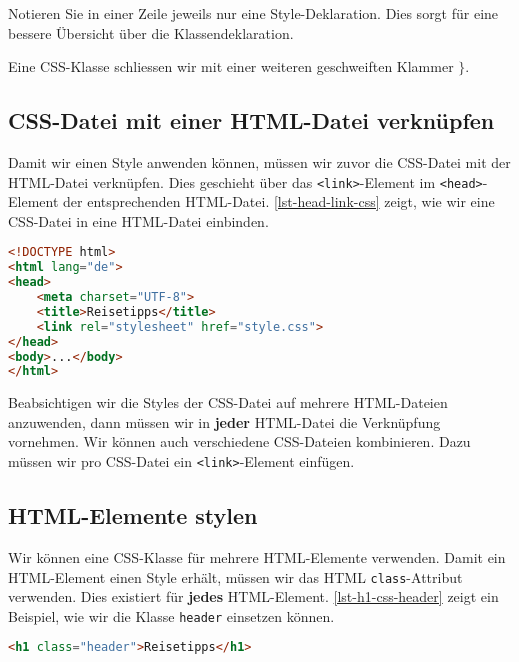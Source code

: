 \begin{cleancode}
Notieren Sie in einer Zeile jeweils nur eine Style-Deklaration. Dies sorgt für eine bessere Übersicht über die Klassendeklaration.
\end{cleancode}

Eine \ac{CSS}-Klasse schliessen wir mit einer weiteren geschweiften Klammer $\}$.

\subsection{\ac{CSS}-Datei mit einer \ac{HTML}-Datei verknüpfen}

Damit wir einen Style anwenden können, müssen wir zuvor die \ac{CSS}-Datei mit der \ac{HTML}-Datei verknüpfen. Dies geschieht über das \lstinline{<link>}-Element im \lstinline{<head>}-Element der entsprechenden \ac{HTML}-Datei. \autoref{lst-head-link-css} zeigt, wie wir eine \ac{CSS}-Datei in eine \ac{HTML}-Datei einbinden.

\begin{lstlisting}[language=HTML, caption={Die Datei \texttt{style.css} wird mit einer \ac{HTML}-Datei verknüpft.}, label={lst-head-link-css}]
<!DOCTYPE html>
<html lang="de">
<head>
    <meta charset="UTF-8">
    <title>Reisetipps</title>
    <link rel="stylesheet" href="style.css">
</head>
<body>...</body>
</html>
\end{lstlisting}

Beabsichtigen wir die Styles der \ac{CSS}-Datei auf mehrere \ac{HTML}-Dateien anzuwenden, dann müssen wir in \textbf{jeder} \ac{HTML}-Datei die Verknüpfung vornehmen. Wir können auch verschiedene \ac{CSS}-Dateien kombinieren. Dazu müssen wir pro \ac{CSS}-Datei ein \lstinline{<link>}-Element einfügen.

\subsection{\ac{HTML}-Elemente stylen}

Wir können eine \ac{CSS}-Klasse für mehrere \ac{HTML}-Elemente verwenden. Damit ein \ac{HTML}-Element einen Style erhält, müssen wir das \ac{HTML} \lstinline{class}-Attribut verwenden. Dies existiert für \textbf{jedes} \ac{HTML}-Element. \autoref{lst-h1-css-header} zeigt ein Beispiel, wie wir die Klasse \texttt{header} einsetzen können.

\begin{lstlisting}[language=HTML, caption={Das \lstinline{h1}-Element verwendet die Klasse \lstinline{header}.}, label={lst-h1-css-header}]
<h1 class="header">Reisetipps</h1>
\end{lstlisting}

